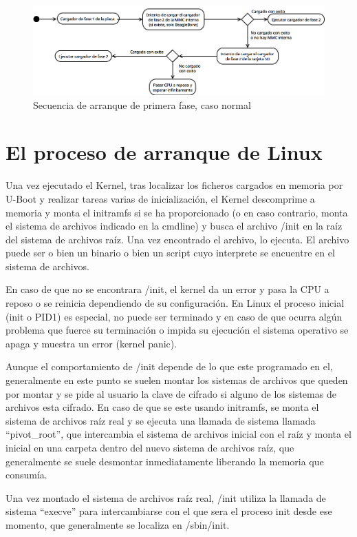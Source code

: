 \documentclass{tfg}
\begin{document}
\begin{figure}[hb]
	\centering
	\includegraphics[scale=0.44]{images/stage1_boot_sequence}
	\caption{Secuencia de arranque de primera fase, caso normal}
\end{figure}

\section{El proceso de arranque de Linux}
Una vez ejecutado el Kernel, tras localizar los ficheros cargados en memoria por U-Boot y realizar tareas varias de inicialización, el Kernel descomprime a memoria y monta el initramfs si se ha proporcionado (o en caso contrario, monta el sistema de archivos indicado en la cmdline) y busca el archivo /init en la raíz del sistema de archivos raíz. Una vez encontrado el archivo, lo ejecuta. El archivo puede ser o bien un binario o bien un script cuyo interprete se encuentre en el sistema de archivos.

En caso de que no se encontrara /init, el kernel da un error y pasa la CPU a reposo o se reinicia dependiendo de su configuración. En Linux el proceso inicial (init o PID1) es especial, no puede ser terminado y en caso de que ocurra algún problema que fuerce su terminación o impida su ejecución el sistema operativo se apaga y muestra un error (kernel panic).

Aunque el comportamiento de /init depende de lo que este programado en el, generalmente en este punto se suelen montar los sistemas de archivos que queden por montar y se pide al usuario la clave de cifrado si alguno de los sistemas de archivos esta cifrado. En caso de que se este usando initramfs, se monta el sistema de archivos raíz real y se ejecuta una llamada de sistema llamada ``pivot\_root'', que intercambia el sistema de archivos inicial con el raíz y monta el inicial en una carpeta dentro del nuevo sistema de archivos raíz, que generalmente se suele desmontar inmediatamente liberando la memoria que consumía.

Una vez montado el sistema de archivos raíz real, /init utiliza la llamada de sistema ``execve'' para intercambiarse con el que sera el proceso init desde ese momento, que generalmente se localiza en /sbin/init.
\end{document}
